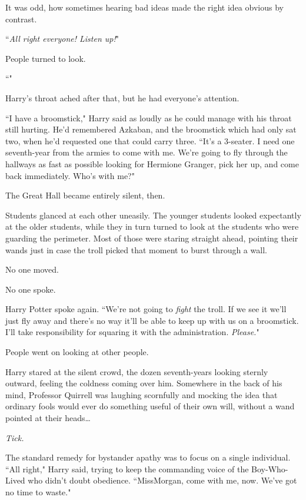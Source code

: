 It was odd, how sometimes hearing bad ideas made the right idea obvious by contrast.

``\emph{All right everyone! Listen up!}"

People turned to look.

``"

Harry's throat ached after that, but he had everyone's attention.

``I have a broomstick," Harry said as loudly as he could manage with his throat still hurting. He'd remembered Azkaban, and the broomstick which had only sat two, when he'd requested one that could carry three. ``It's a 3-seater. I need one seventh-year from the armies to come with me. We're going to fly through the hallways as fast as possible looking for Hermione Granger, pick her up, and come back immediately. Who's with me?"\nopagebreak

The Great Hall became entirely silent, then.

\later

Students glanced at each other uneasily. The younger students looked expectantly at the older students, while they in turn turned to look at the students who were guarding the perimeter. Most of those were staring straight ahead, pointing their wands just in case the troll picked that moment to burst through a wall.

No one moved.

No one spoke.

Harry Potter spoke again. ``We're not going to \emph{fight} the troll. If we see it we'll just fly away and there's no way it'll be able to keep up with us on a broomstick. I'll take responsibility for squaring it with the administration. \emph{Please.}"

People went on looking at other people.

\later

Harry stared at the silent crowd, the dozen seventh-years looking sternly outward, feeling the coldness coming over him. Somewhere in the back of his mind, Professor Quirrell was laughing scornfully and mocking the idea that ordinary fools would ever do something useful of their own will, without a wand pointed at their heads{\ldots}

\emph{Tick.}

The standard remedy for bystander apathy was to focus on a single individual. ``All right," Harry said, trying to keep the commanding voice of the Boy-Who-Lived who didn't doubt obedience. ``Miss\?Morgan, come with me, now. We've got no time to waste."


